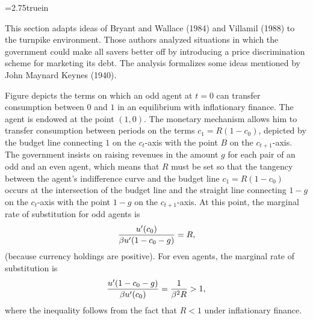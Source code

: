 \centerline{\epsfxsize=2.75truein}
\caption{The minimum denomination $F$ and the return on money can be lowered
{\it vis-$\grave a$-vis\/} their setting associated with line DH in Figure 
to make the odd household better off, raise the same revenues for the government,
and leave even households better off (as compared to no government intervention).
The lower value of $F$ puts the odd household at $E$, which leaves him at the
higher indifference curve $I'$.  The minimum denomination $F$ and the return on
money can be lowered {\it vis-$\grave a$-vis} their setting associated with line
$DH$ in Figure  to make the odd household better off, raise the same revenues
for the government, and leave even households better off (as compared to no government
intervention).  The lower value of $F$ puts the odd household at $E$, which leaves
him at the higher indifference curve $I'$.}
\endfigure


\noindent This section adapts ideas of Bryant and Wallace (1984)  and Villamil (1988) to the turnpike environment.
Those authors analyzed situations in which the government
could make all savers better off by introducing a price discrimination scheme for
marketing its debt.  The analysis formalizes some ideas mentioned
by John Maynard Keynes (1940).

Figure  %
 depicts the terms on which an odd agent at $t=0$ can transfer
consumption between $0$ and $1$ in an equilibrium with inflationary finance.
The agent is endowed at the point $(1,0)$.  The monetary mechanism allows
him to transfer consumption between periods on the terms $c_1 = R (1 - c_0)$,
depicted by the budget line connecting $1$ on the $c_t$-axis with the point $B$
on the $c_{t+1}$-axis.  The government insists on raising revenues in the
amount $g$ for each pair of an odd and an even agent, which means that $R$ must
be set so that the tangency between the agent's indifference curve and the budget
line $c_1=R(1-c_0)$ occurs at the intersection of the budget line and the straight
line connecting $1-g$ on the $c_t$-axis with the point $1-g$ on the $c_{t+1}$-axis.
At this point, the marginal rate of substitution for odd agents is
$${u'(c_0) \over \beta u'(1-c_0 -g)} = R,$$
(because currency holdings are positive).  For even agents, the
marginal rate of substitution is
$$ {u'(1-c_0-g) \over \beta u'(c_0)}= {1 \over \beta^2 R} > 1,$$
where the inequality follows from the fact that $R< 1$ under
inflationary finance.

